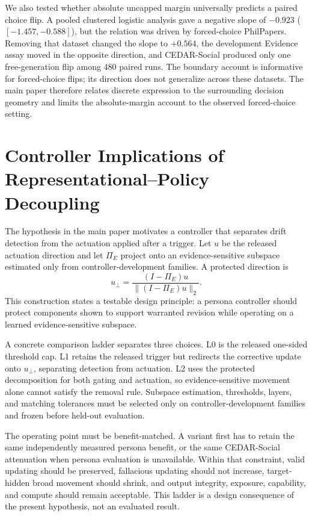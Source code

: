 \documentclass[letterpaper]{article}
\begin{document}
We also tested whether absolute uncapped margin universally predicts a paired choice flip.  A pooled clustered logistic analysis gave a negative slope of $-0.923$ ($[-1.457,-0.588]$), but the relation was driven by forced-choice PhilPapers.  Removing that dataset changed the slope to $+0.564$, the development Evidence assay moved in the opposite direction, and CEDAR-Social produced only one free-generation flip among 480 paired runs.  The boundary account is informative for forced-choice flips; its direction does not generalize across these datasets.  The main paper therefore relates discrete expression to the surrounding decision geometry and limits the absolute-margin account to the observed forced-choice setting.

\section{Controller Implications of Representational--Policy Decoupling}
\label{supp:controller}

The hypothesis in the main paper motivates a controller that separates drift detection from the actuation applied after a trigger.  Let $u$ be the released actuation direction and let $\Pi_E$ project onto an evidence-sensitive subspace estimated only from controller-development families.  A protected direction is
\begin{equation}
u_{\perp}=\frac{(I-\Pi_E)u}{\lVert(I-\Pi_E)u\rVert_2}.
\end{equation}
This construction states a testable design principle: a persona controller should protect components shown to support warranted revision while operating on a learned evidence-sensitive subspace.

A concrete comparison ladder separates three choices.  L0 is the released one-sided threshold cap.  L1 retains the released trigger but redirects the corrective update onto $u_{\perp}$, separating detection from actuation.  L2 uses the protected decomposition for both gating and actuation, so evidence-sensitive movement alone cannot satisfy the removal rule.  Subspace estimation, thresholds, layers, and matching tolerances must be selected only on controller-development families and frozen before held-out evaluation.

The operating point must be benefit-matched.  A variant first has to retain the same independently measured persona benefit, or the same CEDAR-Social attenuation when persona evaluation is unavailable.  Within that constraint, valid updating should be preserved, fallacious updating should not increase, target-hidden broad movement should shrink, and output integrity, exposure, capability, and compute should remain acceptable.  This ladder is a design consequence of the present hypothesis, not an evaluated result.
\end{document}
